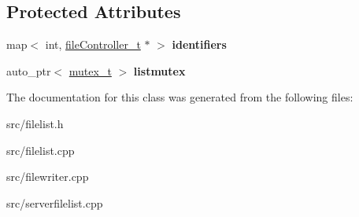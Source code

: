 \subsection*{\-Protected \-Attributes}
\begin{DoxyCompactItemize}
\item 
\hypertarget{classfileList__t_ac11ec95f1b3c78425dffa1189faeb2d7}{map$<$ int, \hyperlink{classfileController__t}{file\-Controller\-\_\-t} $\ast$ $>$ {\bfseries identifiers}}\label{classfileList__t_ac11ec95f1b3c78425dffa1189faeb2d7}

\item 
\hypertarget{classfileList__t_aef41b38cda879cca64bfcb2331bb7506}{auto\-\_\-ptr$<$ \hyperlink{classmutex__t}{mutex\-\_\-t} $>$ {\bfseries listmutex}}\label{classfileList__t_aef41b38cda879cca64bfcb2331bb7506}

\end{DoxyCompactItemize}


\-The documentation for this class was generated from the following files\-:\begin{DoxyCompactItemize}
\item 
src/filelist.\-h\item 
src/filelist.\-cpp\item 
src/filewriter.\-cpp\item 
src/serverfilelist.\-cpp\end{DoxyCompactItemize}
